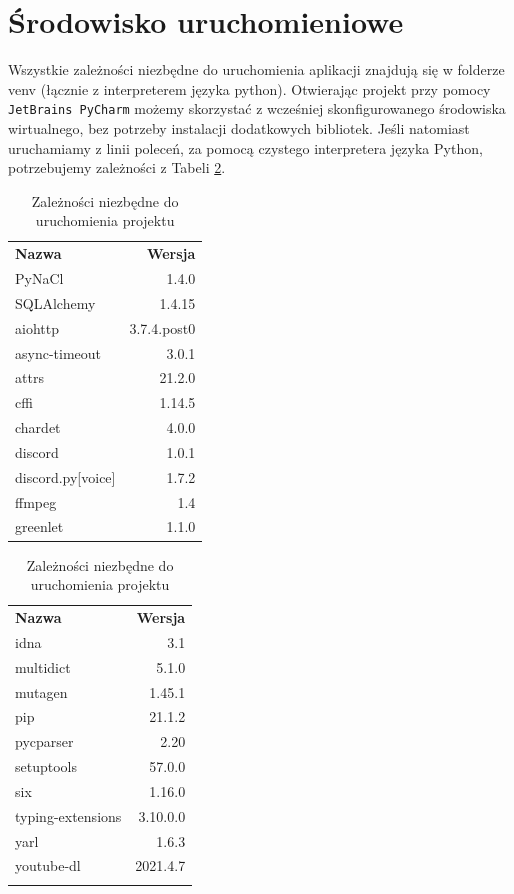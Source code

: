 \documentclass[shortabstract,inz]{iithesis}
\begin{document}
		\section{Środowisko uruchomieniowe}
	Wszystkie zależności niezbędne do uruchomienia aplikacji znajdują się w folderze venv (łącznie z interpreterem języka python). Otwierając projekt przy pomocy \texttt{JetBrains PyCharm}\cite{jetbrainsPycharm} możemy skorzystać z wcześniej skonfigurowanego środowiska wirtualnego, bez potrzeby instalacji dodatkowych bibliotek. Jeśli natomiast uruchamiamy z linii poleceń, za pomocą czystego interpretera języka Python, potrzebujemy zależności z Tabeli \ref{dependenciesTable}.
	
	\begin{table}[h!]
		\centering
		\begin{tabular}{l|r}
			\textbf{Nazwa} & \textbf{Wersja}\\\cline{1-2}
			PyNaCl & 1.4.0 \\
			SQLAlchemy & 1.4.15 \\
			aiohttp & 3.7.4.post0 \\
			async-timeout & 3.0.1 \\
			attrs & 21.2.0 \\
			cffi & 1.14.5 \\
			chardet & 4.0.0 \\
			discord & 1.0.1 \\
			discord.py[voice] & 1.7.2 \\
			ffmpeg & 1.4 \\
			greenlet & 1.1.0 \\
		\end{tabular}
		\begin{tabular}{l|r}
			\textbf{Nazwa} & \textbf{Wersja}\\\cline{1-2}
			idna & 3.1 \\
			multidict & 5.1.0 \\
			mutagen & 1.45.1 \\
			pip & 21.1.2 \\
			pycparser & 2.20 \\
			setuptools & 57.0.0 \\
			six & 1.16.0 \\
			typing-extensions & 3.10.0.0 \\
			yarl & 1.6.3 \\
			youtube-dl & 2021.4.7 \\
			\multicolumn{1}{c}{ } 
		\end{tabular}
		\caption{Zależności niezbędne do uruchomienia projektu}
		\label{dependenciesTable}
	\end{table}
\end{document}
